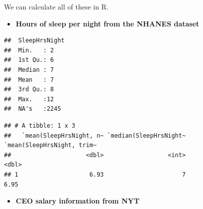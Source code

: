 \documentclass[]{book}
\newenvironment{Shaded}{\begin{snugshade}}{\end{snugshade}}
\newcommand{\CommentTok}[1]{\textcolor[rgb]{0.56,0.35,0.01}{\textit{#1}}}
\newcommand{\DataTypeTok}[1]{\textcolor[rgb]{0.13,0.29,0.53}{#1}}
\newcommand{\FloatTok}[1]{\textcolor[rgb]{0.00,0.00,0.81}{#1}}
\newcommand{\KeywordTok}[1]{\textcolor[rgb]{0.13,0.29,0.53}{\textbf{#1}}}
\newcommand{\NormalTok}[1]{#1}
\newcommand{\OperatorTok}[1]{\textcolor[rgb]{0.81,0.36,0.00}{\textbf{#1}}}
\newcommand{\OtherTok}[1]{\textcolor[rgb]{0.56,0.35,0.01}{#1}}
\newcommand{\StringTok}[1]{\textcolor[rgb]{0.31,0.60,0.02}{#1}}
\providecommand{\tightlist}{%
  \setlength{\itemsep}{0pt}\setlength{\parskip}{0pt}}
\begin{document}
We can calculate all of these in R.

\begin{itemize}
\tightlist
\item
  \textbf{Hours of sleep per night from the NHANES dataset}
\end{itemize}

\begin{Shaded}
\end{Shaded}

\begin{verbatim}
##  SleepHrsNight 
##  Min.   : 2    
##  1st Qu.: 6    
##  Median : 7    
##  Mean   : 7    
##  3rd Qu.: 8    
##  Max.   :12    
##  NA's   :2245
\end{verbatim}

\begin{Shaded}
\end{Shaded}

\begin{verbatim}
## # A tibble: 1 x 3
##   `mean(SleepHrsNight, n~ `median(SleepHrsNight~ `mean(SleepHrsNight, trim~
##                     <dbl>                  <int>                      <dbl>
## 1                    6.93                      7                       6.95
\end{verbatim}

\begin{itemize}
\tightlist
\item
  \textbf{CEO salary information from NYT}
\end{itemize}

\begin{Shaded}
\end{Shaded}
\end{document}
